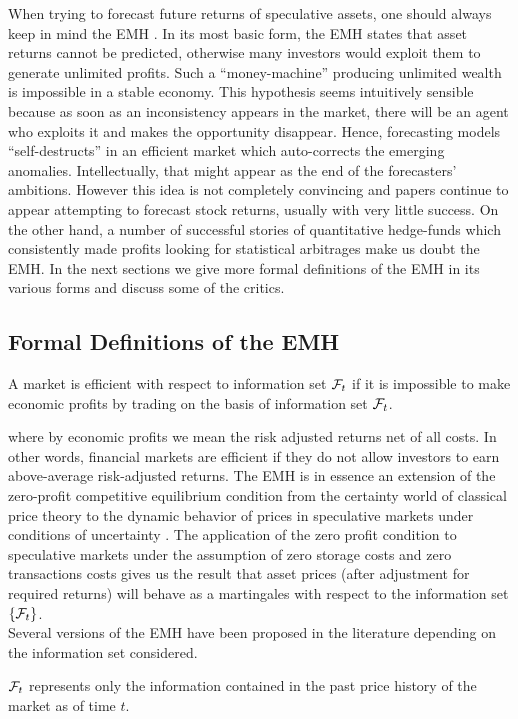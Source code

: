 When trying to forecast future returns of speculative assets, one should always keep in mind the \gls{EMH} \cite{timmermann2004efficient}. In its most basic form, the EMH states that asset returns cannot be predicted, otherwise many investors would exploit them to generate unlimited profits. Such a ``money-machine'' producing unlimited wealth is impossible in a stable economy. This hypothesis seems intuitively sensible because as soon as an inconsistency appears in the market, there will be an agent who exploits it and makes the opportunity disappear. Hence, forecasting models ``self-destructs'' in an efficient market which auto-corrects the emerging anomalies. Intellectually, that might appear as the end of the forecasters' ambitions. However this idea is not completely convincing and papers continue to appear attempting to forecast stock returns, usually with very little success. On the other hand, a number of successful stories of quantitative hedge-funds which consistently made profits looking for statistical arbitrages make us doubt the EMH. In the next sections we give more formal definitions of the EMH in its various forms and discuss some of the critics.

\subsection{Formal Definitions of the EMH}
\begin{definition}
	A market is efficient with respect to information set $\mathcal{F}_t$ if it is impossible to make economic profits by trading on the basis of information set $\mathcal{F}_t$.
\end{definition}
where by economic profits we mean the risk adjusted returns net of all costs. In other words, financial markets are efficient if they do not allow investors to earn above-average risk-adjusted returns. The EMH is in essence an extension of the zero-profit competitive equilibrium condition from the certainty world of classical price theory to the dynamic behavior of prices in speculative markets under conditions of uncertainty \cite{jensen1978some}. The application of the zero profit condition to speculative markets under the assumption of zero storage costs and zero transactions costs gives us the result that asset prices (after adjustment for required returns) will behave as a martingales with respect to the information set $\{\mathcal{F}_t\}$.\\
Several versions of the EMH have been proposed in the literature depending on the information set considered.
\begin{definition}
	$\mathcal{F}_t$ represents only the information contained in the past price history of the market as of time $t$. 
\end{definition}

